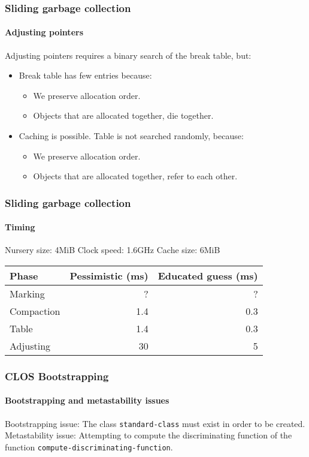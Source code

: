 \documentclass{beamer}
\begin{document}
\begin{frame}
  \frametitle{Sliding garbage collection} 
  \framesubtitle{Adjusting pointers}

  Adjusting pointers requires a binary search of the break table, but: 

  \begin{itemize}
  \item Break table has few entries because:
    \begin{itemize}
    \item We preserve allocation order.
    \item Objects that are allocated together, die together.
    \end{itemize}
  \item Caching is possible.  Table is not searched randomly, because: 
    \begin{itemize}
    \item We preserve allocation order.
    \item Objects that are allocated together, refer to each other.
    \end{itemize}
  \end{itemize}

\end{frame}
\begin{frame}
  \frametitle{Sliding garbage collection}
  \framesubtitle{Timing}

Nursery size: 4MiB
\vskip 0.25cm
Clock speed: 1.6GHz
\vskip 0.25cm
Cache size: 6MiB
\vskip 0.5cm
\begin{tabular}{|l|r|r|}
  \hline
  Phase & Pessimistic (ms) & Educated guess (ms)\\
  \hline
  \hline
  Marking & ? & ?\\
  \hline
  Compaction & 1.4 &  0.3\\
  \hline
  Table   & 1.4 & 0.3 \\
  \hline
  Adjusting & 30 & 5 \\
  \hline
\end{tabular}

\end{frame}
\begin{frame}
  \frametitle{CLOS Bootstrapping}
  \framesubtitle{Bootstrapping and metastability issues}

Bootstrapping issue: The class \texttt{standard-class} must exist in
order to be created.
\vskip 0.25cm
Metastability issue: Attempting to compute the discriminating function
of the function \texttt{compute-discriminating-function}.

\end{frame}
\end{document}
